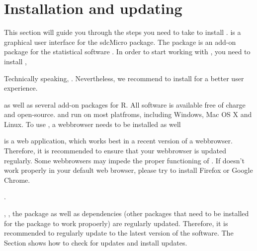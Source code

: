 \documentclass[letterpaper,10pt,english]{sphinxmanual}
\begin{document}
\chapter{Installation and updating}
\label{\detokenize{installation::doc}}\label{\detokenize{installation:installation-and-updating}}
This section will guide you through the steps you need to take to install .
 is a graphical user interface for the sdcMicro package.
The  package is an add-on package for the statistical software . In order
to start working with , you need to install ,  %
\begin{footnote}[1]\sphinxAtStartFootnote
Technically speaking, . Nevertheless, we recommend to install  for a better user experience.
%
\end{footnote} as well as several
add-on packages for R. All software is available free of charge and open-source.
 and  run on most platfroms, including Windows, Mac OS X and Linux. To use ,
a webbrowser needs to be installed as well %
\begin{footnote}[2]\sphinxAtStartFootnote
{} is a  web application, which works best in a recent version of a webbrowser. Therefore, it is recommended to ensure that your webbrowser is updated regularly. Some webbrowsers may impede the proper functioning of . If  doesn’t work properly in your default web browser, please try to install Firefox or Google Chrome.
%
\end{footnote}.

, , the  package as well as dependencies (other  packages
that need to be installed for the  package to work propoerly) are regularly updated.
Therefore, it is recommended to regularly update to the latest version of the software.
The Section {\hyperref[\detokenize{installation:updating-r-rstudio-and-the-sdcmicro-package}]{}} shows how to check for updates
and install updates.
\end{document}
